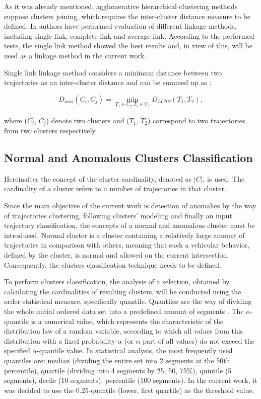 As it was already mentioned, agglomerative hierarchical clustering methods suppose clusters joining, which requires the inter-cluster distance measure to be defined. In \cite{inproceedings:7_related_work} authors have performed evaluation of different linkage methods, including single link, complete link and average link. According to the performed tests, the single link method showed the best results and, in view of this, will be used as a linkage method in the current work.

Single link linkage method considers a minimum distance between two trajectories as an inter-cluster distance and can be summed up as \cite{inproceedings:7_related_work}:

\begin{equation} \label{eq:single_link}
D_{min}(C_i, C_j) = \min_{T_1 \in C_i, T_2 \in C_j} D_{LCSS}(T_1, T_2),
\end{equation} 

where ($C_i$, $C_j$) denote two clusters and ($T_1$, $T_2$) correspond to two trajectories from two clusters respectively.

\subsection{Normal and Anomalous Clusters Classification}

Hereinafter the concept of the cluster cardinality, denoted as $|C|$, is used.
The cardinality of a cluster refers to a number of trajectories in that cluster.

Since the main objective of the current work is detection of anomalies by the way of trajectories clustering, following clusters' modeling and finally an input trajectory classification, the concepts of a normal and anomalous cluster must be introduced. Normal cluster is a cluster containing a relatively large amount of trajectories in comparison with others, meaning that such a vehicular behavior, defined by the cluster, is normal and allowed on the current intersection. Consequently, the clusters classification technique needs to be defined.

To perform clusters classification, the analysis of a selection, obtained by calculating the cardinalities of resulting clusters, will be conducted using the order statistical measure, specifically quantile. Quantiles are the way of dividing the whole initial ordered data set into a predefined amount of segments \cite{inbook:stats}. The $\alpha$-quantile is a numerical value, which represents the characteristic of the distribution law of a random variable, according to which all values from this distribution with a fixed probability $\alpha$ (or $\alpha$ part of all values) do not exceed the specified $\alpha$-quantile value. In statistical analysis, the most frequently used quantiles are: median (dividing the entire set into 2 segments at the 50th percentile), quartile (dividing into 4 segments by 25, 50, 75\%), quintile (5 segments), decile (10 segments), percentile (100 segments). In the current work, it was decided to use the 0.25-quantile (lower, first quartile) as the threshold value.

